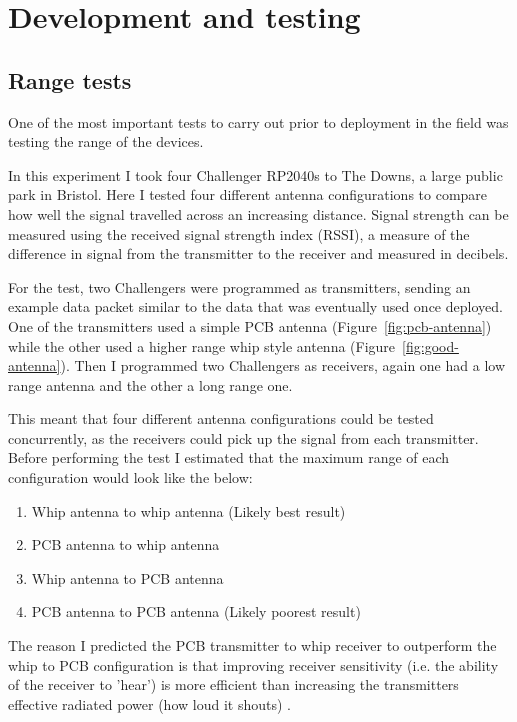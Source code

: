 \section{Development and testing}

\subsection{Range tests}\label{sec:range-tests}

One of the most important tests to carry out prior to deployment in the field
was testing the range of the devices.

In this experiment I took four Challenger RP2040s to The Downs, a large public
park in Bristol. Here I tested four different antenna configurations to compare
how well the signal travelled across an increasing distance. Signal strength can
be measured using the received signal strength index (RSSI), a measure of the
difference in signal from the transmitter to the receiver and measured in
decibels.

For the test, two Challengers were programmed as transmitters, sending an
example data packet similar to the data that was eventually used once deployed.
One of the transmitters used a simple PCB antenna (Figure~\ref{fig:pcb-antenna})
while the other used a higher range whip style antenna
(Figure~\ref{fig:good-antenna}). Then I programmed two Challengers as receivers,
again one had a low range antenna and the other a long range one.

This meant that four different antenna configurations could be tested
concurrently, as the receivers could pick up the signal from each transmitter.
Before performing the test I estimated that the maximum range of each
configuration would look like the below:

\begin{enumerate}
    \item Whip antenna to whip antenna (Likely best result)
    \item PCB antenna to whip antenna
    \item Whip antenna to PCB antenna
    \item PCB antenna to PCB antenna (Likely poorest result)
\end{enumerate}

The reason I predicted the PCB transmitter to whip receiver to outperform the
whip to PCB configuration is that improving receiver sensitivity (i.e. the
ability of the receiver to 'hear') is more efficient than increasing the
transmitters effective radiated power (how loud it shouts) \cite{simpulse25}.

